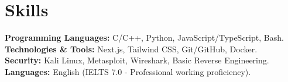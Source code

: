 \documentclass[11pt,a4paper]{article}
\begin{document}
\section{Skills}
\begin{itemize}[leftmargin=0.15in, label={}]
  \small{\item{
   \textbf{Programming Languages:} C/C++, Python, JavaScript/TypeScript, Bash. \\
   \textbf{Technologies \& Tools:} Next.js, Tailwind CSS, Git/GitHub, Docker. \\
   \textbf{Security:} Kali Linux, Metasploit, Wireshark, Basic Reverse Engineering. \\
   \textbf{Languages:} English (IELTS 7.0 - Professional working proficiency).
  }}
\end{itemize}
\end{document}
